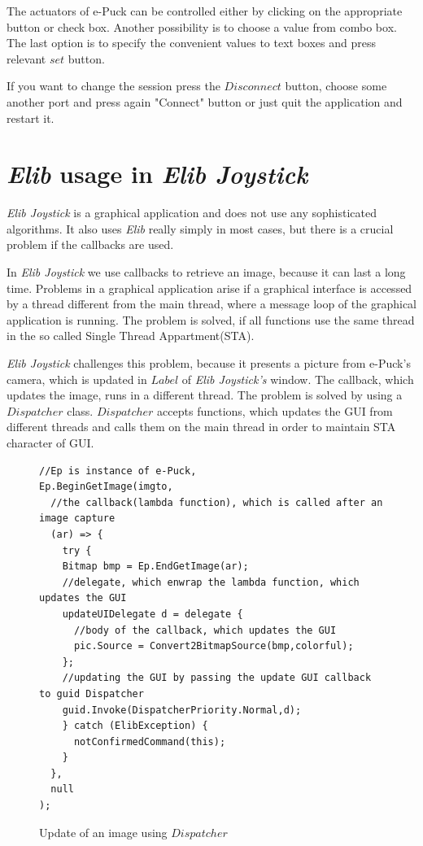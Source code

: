   The actuators of e-Puck can be controlled either by clicking on the appropriate button or check box. 
  Another	possibility is to choose a value from combo box.
  The last option is to specify the  convenient values to text boxes and press relevant $set$ button.

  If you want to change the session press the $Disconnect$ button, choose some another port and 
  press again "Connect" button or	just quit the application and restart it.

  \section{{\it Elib} usage in {\it Elib Joystick}}\label{sec:joystick_trick}
  {\it Elib Joystick} is a graphical application and does not use any sophisticated algorithms. 
  It also uses {\it Elib} really simply in most cases, but there is a crucial problem if the callbacks are used.

  In {\it Elib Joystick} we use callbacks to retrieve an image, because it can last a long time.
  Problems in a graphical application arise if a graphical interface is accessed by a thread different from
  the main thread, where a message loop of the graphical application is running. The problem is solved,
  if all functions use the same thread in the so called Single Thread Appartment(STA).

  {\it Elib Joystick} challenges this problem, because it presents a picture from e-Puck's camera, which is updated
  in $Label$ of {\it Elib Joystick's} window. The callback, which updates the image, runs in a different thread.
  The problem is solved by using a $Dispatcher$ class. $Dispatcher$ accepts functions, which updates
  the GUI from different threads and calls them on the main thread in order to maintain STA character
  of GUI. 

\begin{figure}[!hbp]
\begin{lstlisting}
//Ep is instance of e-Puck,
Ep.BeginGetImage(imgto,
  //the callback(lambda function), which is called after an image capture
  (ar) => {
    try {
    Bitmap bmp = Ep.EndGetImage(ar);
    //delegate, which enwrap the lambda function, which updates the GUI
    updateUIDelegate d = delegate {
      //body of the callback, which updates the GUI
      pic.Source = Convert2BitmapSource(bmp,colorful);
    };
    //updating the GUI by passing the update GUI callback to guid Dispatcher
    guid.Invoke(DispatcherPriority.Normal,d);
    } catch (ElibException) {
      notConfirmedCommand(this);
    }
  }, 
  null
);
\end{lstlisting}
\caption{Update of an image using $Dispatcher$}
\label{updispatcher}
\end{figure}


